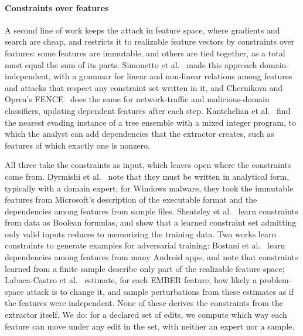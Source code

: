 \paragraph{Constraints over features}
A second line of work keeps the attack in feature space, where gradients and search are cheap, and restricts it to
realizable feature vectors by constraints over features: some features are immutable, and others are tied together, as
a total must equal the sum of its parts. Simonetto et al.~\cite{simonetto2022unified} made this approach
domain-independent, with a grammar for linear and non-linear relations among features and attacks that respect any
constraint set written in it, and Chernikova and Oprea's FENCE~\cite{chernikova2022fence} does the same for
network-traffic and malicious-domain classifiers, updating dependent features after each step. Kantchelian et al.~\cite{kantchelian2016evasion} find the nearest evading instance of a tree ensemble with a
mixed integer program, to which the analyst can add dependencies that the extractor creates, such as features of which
exactly one is nonzero.

All three take the constraints as input, which leaves open where the constraints come from. Dyrmishi et
al.~\cite{dyrmishi2023empirical} note that they must be written in analytical form, typically with a domain expert; for
Windows malware, they took the immutable features from Microsoft's description of the executable format and the
dependencies among features from sample files. Sheatsley et al.~\cite{sheatsley2021robustness} learn constraints from
data as Boolean formulas, and show that a learned constraint set admitting only valid inputs reduces to memorizing the
training data. Two works learn constraints to generate examples for adversarial training: Bostani et
al.~\cite{bostani2025level} learn dependencies among features from many Android apps, and note that constraints learned
from a finite sample describe only part of the realizable feature space; Labaca-Castro et
al.~\cite{labaca2022realizable} estimate, for each EMBER feature, how likely a problem-space
attack is to change it, and sample perturbations from these estimates as if the features were independent. None of
these derives the constraints from the extractor itself. We do: for a declared set of edits, we compute which way each
feature can move under any edit in the set, with neither an expert nor a sample.


